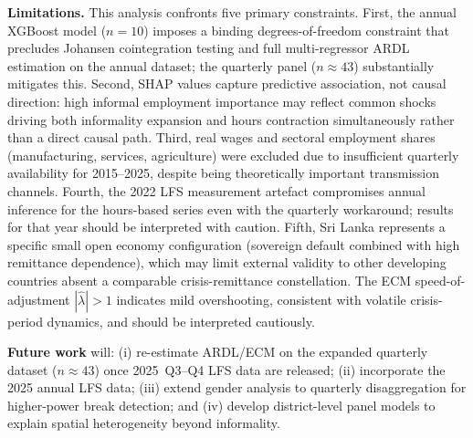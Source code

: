 \documentclass[sigconf]{acmart}
\begin{document}
\textbf{Limitations.} This analysis confronts five primary constraints.
First, the annual XGBoost model ($n{=}10$) imposes a binding
degrees-of-freedom constraint that precludes Johansen cointegration
testing and full multi-regressor ARDL estimation on the annual dataset;
the quarterly panel ($n{\approx}43$) substantially mitigates this.
Second, SHAP values capture predictive association, not causal direction:
high informal employment importance may reflect common shocks driving
both informality expansion and hours contraction simultaneously rather
than a direct causal path. Third, real wages and sectoral employment
shares (manufacturing, services, agriculture) were excluded due to
insufficient quarterly availability for 2015--2025, despite being
theoretically important transmission channels. Fourth, the 2022 LFS
measurement artefact compromises annual inference for the hours-based
series even with the quarterly workaround; results for that year should
be interpreted with caution. Fifth, Sri Lanka represents a specific
small open economy configuration (sovereign default combined with high
remittance dependence), which may limit external validity to other
developing countries absent a comparable crisis-remittance constellation.
The ECM speed-of-adjustment $|\hat\lambda|{>}1$ indicates mild
overshooting, consistent with volatile crisis-period dynamics, and
should be interpreted cautiously.

\textbf{Future work} will: (i) re-estimate ARDL/ECM on the expanded
quarterly dataset ($n{\approx}43$) once 2025~Q3--Q4 LFS data are released;
(ii) incorporate the 2025 annual LFS data; (iii) extend gender analysis to
quarterly disaggregation for higher-power break detection; and (iv) develop
district-level panel models to explain spatial heterogeneity beyond
informality.



\end{document}
